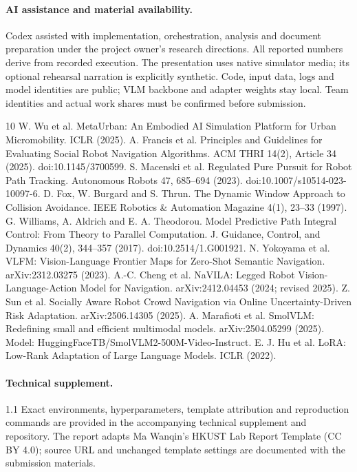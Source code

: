 \documentclass[a4paper,12pt]{article}
\begin{document}
\paragraph{AI assistance and material availability.}
Codex assisted with implementation, orchestration, analysis and document preparation under the project owner's research directions. All reported numbers derive from recorded execution. The presentation uses native simulator media; its optional rehearsal narration is explicitly synthetic. Code, input data, logs and model identities are public; VLM backbone and adapter weights stay local. Team identities and actual work shares must be confirmed before submission.

\FloatBarrier
{}
\begin{thebibliography}{10}\small{}\setlength{\itemsep}{3pt}
 W. Wu et al. MetaUrban: An Embodied AI Simulation Platform for Urban Micromobility. ICLR (2025).
 A. Francis et al. Principles and Guidelines for Evaluating Social Robot Navigation Algorithms. ACM THRI 14(2), Article 34 (2025). doi:10.1145/3700599.
 S. Macenski et al. Regulated Pure Pursuit for Robot Path Tracking. Autonomous Robots 47, 685--694 (2023). doi:10.1007/s10514-023-10097-6.
 D. Fox, W. Burgard and S. Thrun. The Dynamic Window Approach to Collision Avoidance. IEEE Robotics \& Automation Magazine 4(1), 23--33 (1997).
 G. Williams, A. Aldrich and E. A. Theodorou. Model Predictive Path Integral Control: From Theory to Parallel Computation. J. Guidance, Control, and Dynamics 40(2), 344--357 (2017). doi:10.2514/1.G001921.
 N. Yokoyama et al. VLFM: Vision-Language Frontier Maps for Zero-Shot Semantic Navigation. arXiv:2312.03275 (2023).
 A.-C. Cheng et al. NaVILA: Legged Robot Vision-Language-Action Model for Navigation. arXiv:2412.04453 (2024; revised 2025).
 Z. Sun et al. Socially Aware Robot Crowd Navigation via Online Uncertainty-Driven Risk Adaptation. arXiv:2506.14305 (2025).
 A. Marafioti et al. SmolVLM: Redefining small and efficient multimodal models. arXiv:2504.05299 (2025). Model: HuggingFaceTB/SmolVLM2-500M-Video-Instruct.
 E. J. Hu et al. LoRA: Low-Rank Adaptation of Large Language Models. ICLR (2022).
\end{thebibliography}
\paragraph{Technical supplement.}
\begin{spacing}{1.1}\small
Exact environments, hyperparameters, template attribution and reproduction commands are provided in the accompanying technical supplement and repository. The report adapts Ma Wanqin's HKUST Lab Report Template (CC BY 4.0); source URL and unchanged template settings are documented with the submission materials.
\end{spacing}
\end{document}
